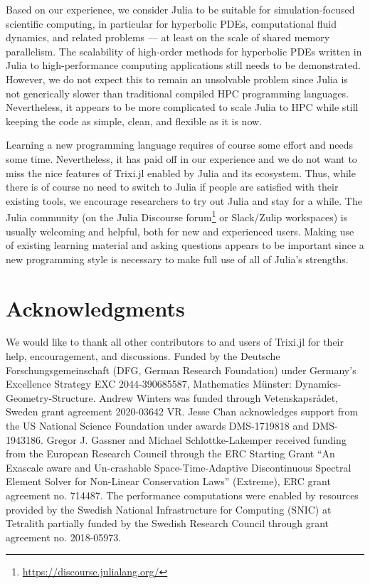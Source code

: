 \documentclass[hidelinks]{juliacon} %
\newcommand{\trixi}{Trixi.jl\xspace}
\begin{document}
Based on our experience, we consider Julia to be suitable for simulation-focused
scientific computing, in particular for hyperbolic PDEs, computational fluid
dynamics, and related problems --- at least on the scale of shared memory
parallelism. The scalability of high-order methods for hyperbolic PDEs written
in Julia to high-performance computing applications still needs to be demonstrated.
However, we do not expect this to remain an unsolvable problem since Julia is not
generically slower than traditional compiled HPC programming languages. Nevertheless,
it appears to be more complicated to scale Julia to HPC while still keeping the
code as simple, clean, and flexible as it is now.

Learning a new programming language requires of course some effort and needs some
time. Nevertheless, it has paid off in our experience and we do not want to miss the
nice features of \trixi enabled by Julia and its ecosystem. Thus, while there is
of course no need to switch to Julia if people are satisfied with their existing
tools, we encourage researchers to try out Julia and stay for a while. The Julia
community (on the Julia Discourse forum\footnote{\url{https://discourse.julialang.org/}}
or Slack/Zulip workspaces) is usually welcoming and helpful, both for new and
experienced users. Making use of existing learning material and asking questions
appears to be important since a new programming style is necessary to make full
use of all of Julia's strengths.



\section*{Acknowledgments}

We would like to thank all other contributors to and users of \trixi for their
help, encouragement, and discussions.
Funded by the Deutsche Forschungsgemeinschaft (DFG, German Research Foundation)
under Germany's Excellence Strategy EXC 2044-390685587, Mathematics Münster:
Dynamics-Geometry-Structure.
Andrew Winters was funded through Vetenskapsr{\aa}det, Sweden grant
agreement 2020-03642 VR.
Jesse Chan acknowledges support from the US National Science Foundation under
awards DMS-1719818 and DMS-1943186.
Gregor J. Gassner and Michael Schlottke-Lakemper received funding from the European Research Council through the ERC Starting Grant “An Exascale aware and Un-crashable Space-Time-Adaptive Discontinuous Spectral Element Solver for Non-Linear Conservation Laws” (Extreme), ERC grant agreement no. 714487.
The performance computations were enabled by resources provided by the Swedish National
Infrastructure for Computing (SNIC) at Tetralith partially funded by the Swedish
Research Council through grant agreement no. 2018-05973.
\end{document}
